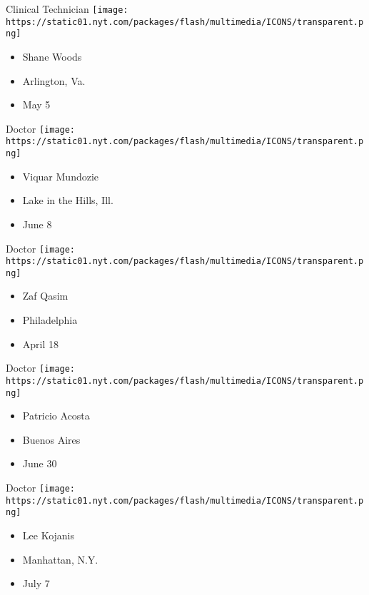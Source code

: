 \protect\hyperlink{item-shane-woods}{}

Clinical Technician
\texttt{[image: https://static01.nyt.com/packages/flash/multimedia/ICONS/transparent.png]}

\begin{itemize}
\tightlist
\item
  Shane Woods
\item
  Arlington, Va.
\item
  May 5
\end{itemize}

\protect\hyperlink{item-viquar-mundozie}{}

Doctor
\texttt{[image: https://static01.nyt.com/packages/flash/multimedia/ICONS/transparent.png]}

\begin{itemize}
\tightlist
\item
  Viquar Mundozie
\item
  Lake in the Hills, Ill.
\item
  June 8
\end{itemize}

\protect\hyperlink{item-zaf-qasim}{}

Doctor
\texttt{[image: https://static01.nyt.com/packages/flash/multimedia/ICONS/transparent.png]}

\begin{itemize}
\tightlist
\item
  Zaf Qasim
\item
  Philadelphia
\item
  April 18
\end{itemize}

\protect\hyperlink{item-patricio-acosta}{}

Doctor
\texttt{[image: https://static01.nyt.com/packages/flash/multimedia/ICONS/transparent.png]}

\begin{itemize}
\tightlist
\item
  Patricio Acosta
\item
  Buenos Aires
\item
  June 30
\end{itemize}

\protect\hyperlink{item-lee-kojanis}{}

Doctor
\texttt{[image: https://static01.nyt.com/packages/flash/multimedia/ICONS/transparent.png]}

\begin{itemize}
\tightlist
\item
  Lee Kojanis
\item
  Manhattan, N.Y.
\item
  July 7
\end{itemize}

